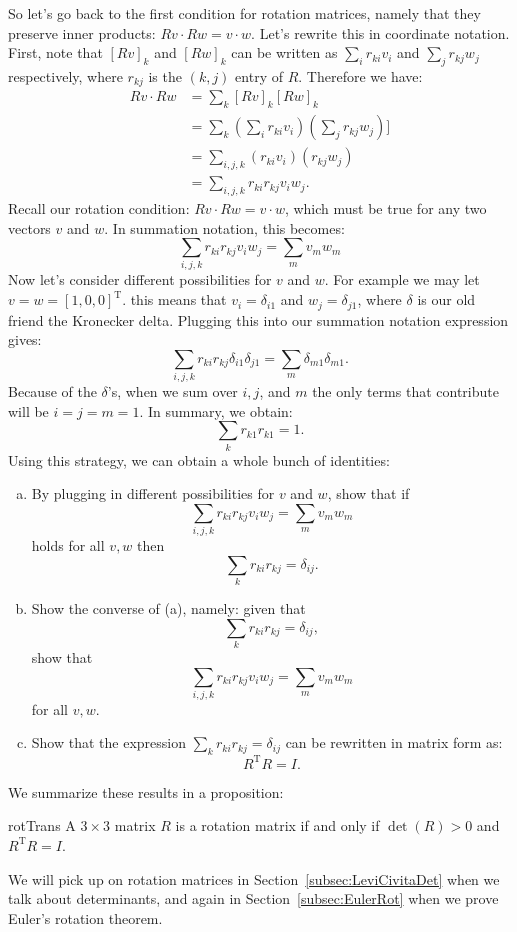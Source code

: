So let's go back to the first condition for rotation matrices, namely that they preserve inner products: $Rv \cdot Rw = v \cdot w$. Let's rewrite this in coordinate notation. First, note that $[Rv]_k$  and $[Rw]_k$ can be written as $\sum_i r_{ki}v_i$ and $\sum_j r_{kj} w_j$ respectively, where $r_{kj}$ is  the $(k,j)$ entry of $R$. Therefore we have:
\begin{align*}
 Rv \cdot Rw &= \sum_k  [Rv]_k[Rw]_k \\
&= \sum_k \left(\sum_i r_{ki}v_i \right)\left(\sum_j r_{kj}w_j \right)] \\
&= \sum_{i,j,k} (r_{ki}v_i)(r_{kj}w_j) \\
&= \sum_{i,j,k} r_{ki}r_{kj} v_i w_j. 
\end{align*}
Recall our rotation condition:  $ Rv \cdot Rw = v\cdot w$, which must be true for any two vectors $v$ and $w$. In summation notation, this becomes:
\[\sum_{i,j,k} r_{ki}r_{kj} v_i w_j =  \sum_m  v_m w_m \]
Now let's consider different possibilities for $v$ and $w$. For example we may let $ v=w=[1,0,0]^{\text{T}}$. this means that $v_i = \delta_{i1}$ and $w_j = \delta_{j1}$, where $\delta$ is our old friend the Kronecker delta.  Plugging this into our summation notation expression gives:
\[\sum_{i,j,k} r_{ki}r_{kj} \delta_{i1}\delta_{j1} =  \sum_m  \delta_{m1}\delta_{m1}. \]
Because of the $\delta$'s, when we sum over $i,j$, and $m$ the only terms that contribute will be $i=j=m=1$.  In summary, we obtain:
\[\sum_{k} r_{k1}r_{k1}  = 1. \]
Using this strategy, we can obtain a whole bunch of identities:

\begin{exercise}{}
\begin{enumerate}[(a)]
\item
By plugging in different possibilities for $v$ and $w$, show that if
\[\sum_{i,j,k} r_{ki}r_{kj} v_i w_j =  \sum_m  v_m w_m \]
holds for all $v, w$ then 
\[\sum_{k} r_{ki}r_{kj}  = \delta_{ij}. \]
\item
Show the converse of (a), namely:  given that
\[\sum_{k} r_{ki}r_{kj}  = \delta_{ij}, \]
show that
\[\sum_{i,j,k} r_{ki}r_{kj} v_i w_j =  \sum_m  v_m w_m \]
for all $v, w$.
\item
Show that the expression $\sum_{k} r_{ki}r_{kj}  = \delta_{ij}$ can be rewritten in matrix form as:
\[R^{\text{T}}R = I.\]
\end{enumerate}
\end{exercise}
We summarize these results in a proposition:

\begin{prop}{rotTrans} A $3 \times 3$ matrix $R$ is a rotation matrix if and only if $\det(R)>0$ and $R^{\text{T}}R = I$.
\end{prop}
We will pick up on rotation matrices in Section~\ref{subsec:LeviCivitaDet} when we talk about determinants, and again in Section~\ref{subsec:EulerRot} when we prove Euler's rotation theorem.

